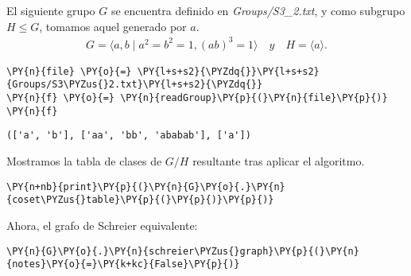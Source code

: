 \begin{enumerate}
\newpage
El siguiente grupo $G$ se encuentra definido en \textit{Groups/S3\_2.txt}, y como subgrupo $H\leq G$, tomamos aquel generado por $a$.
\begin{align*}
    G = \langle a,b \; | \; a^2 = b^2 = 1, (ab)^3=1\rangle \quad y \quad H= \langle a \rangle.
\end{align*}



    \begin{tcolorbox}[breakable, size=fbox, boxrule=1pt, pad at break*=1mm,colback=cellbackground, colframe=cellborder]
\begin{Verbatim}[commandchars=\\\{\}]
\PY{n}{file} \PY{o}{=} \PY{l+s+s2}{\PYZdq{}}\PY{l+s+s2}{Groups/S3\PYZus{}2.txt}\PY{l+s+s2}{\PYZdq{}}
\PY{n}{f} \PY{o}{=} \PY{n}{readGroup}\PY{p}{(}\PY{n}{file}\PY{p}{)}
\PY{n}{f}
\end{Verbatim}
\end{tcolorbox}

            \begin{tcolorbox}[breakable, size=fbox, boxrule=.5pt, pad at break*=1mm, opacityfill=0]
\begin{Verbatim}[commandchars=\\\{\}]
(['a', 'b'], ['aa', 'bb', 'ababab'], ['a'])
\end{Verbatim}
\end{tcolorbox}
        
Mostramos la tabla de clases de $G/H$ resultante tras aplicar el algoritmo.
    \begin{tcolorbox}[breakable, size=fbox, boxrule=1pt, pad at break*=1mm,colback=cellbackground, colframe=cellborder]
\begin{Verbatim}[commandchars=\\\{\}]
\PY{n+nb}{print}\PY{p}{(}\PY{n}{G}\PY{o}{.}\PY{n}{coset\PYZus{}table}\PY{p}{(}\PY{p}{)}\PY{p}{)}
\end{Verbatim}
\end{tcolorbox}

    \begin{center}
    \end{center}



Ahora, el grafo de Schreier equivalente:
    \begin{tcolorbox}[breakable, size=fbox, boxrule=1pt, pad at break*=1mm,colback=cellbackground, colframe=cellborder]
\begin{Verbatim}[commandchars=\\\{\}]
\PY{n}{G}\PY{o}{.}\PY{n}{schreier\PYZus{}graph}\PY{p}{(}\PY{n}{notes}\PY{o}{=}\PY{k+kc}{False}\PY{p}{)}
\end{Verbatim}
\end{tcolorbox}



\end{enumerate}
